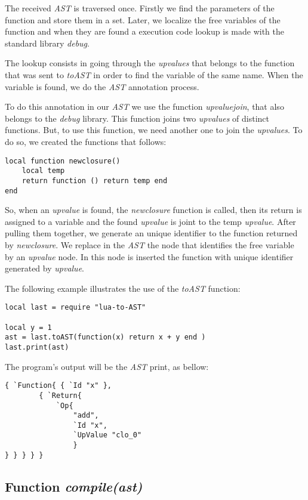 \documentclass[english]{llncs}
\begin{document}
The received \emph{AST} is traversed once.
Firstly we find the parameters of the function and store them in a set.
Later, we localize the free variables of the  function and when they are found a execution code lookup is made with the standard library \emph{debug}.

The lookup consists in going through the \emph{upvalues} that belongs to the function that was sent to \emph{toAST} in order to find the variable of the same name.
When the variable is found, we do the \emph{AST} annotation process.


To do this annotation in our \emph{AST} we use the function \emph{upvaluejoin}, that also belongs to the \emph{debug} library.
This function joins two \emph{upvalues} of distinct functions.
But, to use this function, we need another one to join the \emph{upvalues}. To do so, we created the functions that follows:


\pagebreak
\begin{verbatim}
local function newclosure()
    local temp
    return function () return temp end
end
\end{verbatim}

So, when an \emph{upvalue} is found, the \emph{newclosure} function is called, then its return is assigned to a variable and the found \emph{upvalue} is joint to the temp \emph{upvalue}.
After pulling them together, we generate an unique identifier to the function returned by \emph{newclosure}.
We replace in the \emph{AST} the node that identifies the free variable by an \emph{upvalue} node.
In this node is inserted the function with unique identifier generated by \emph{upvalue}.


The following example illustrates the use of the \emph{toAST} function:


\begin{verbatim}
local last = require "lua-to-AST"

local y = 1
ast = last.toAST(function(x) return x + y end )
last.print(ast)
\end{verbatim}


The program's output will be the \emph{AST} print, as bellow:

\begin{verbatim}
{ `Function{ { `Id "x" },
        { `Return{
            `Op{
                "add",
                `Id "x",
                `UpValue "clo_0"
                }
} } } } }
\end{verbatim}


\subsection{Function \emph{compile(ast)} }
\end{document}
